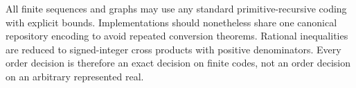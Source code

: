 All finite sequences and graphs may use any standard primitive-recursive coding with explicit bounds.  Implementations should nonetheless share one canonical repository encoding to avoid repeated conversion theorems.  Rational inequalities are reduced to signed-integer cross products with positive denominators.  Every order decision is therefore an exact decision on finite codes, not an order decision on an arbitrary represented real.
